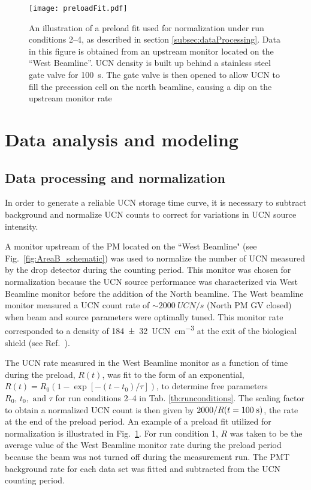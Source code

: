 \begin{figure}
    \centering
    \texttt{[image: preloadFit.pdf]}
    \caption[An illustration of a preload fit used for normalization under run conditions 2--4, as described in section \ref{subsec:dataProcessing}.]
    {An illustration of a preload fit used for normalization under run conditions 2--4, as described in section \ref{subsec:dataProcessing}. Data in this figure is obtained from an upstream monitor located on the ``West Beamline''. UCN density is built up behind a stainless steel gate valve for \qty{100}{\s}. The gate valve is then opened to allow UCN to fill the precession cell on the north beamline, causing a dip on the upstream monitor rate}
    \label{fig:preloadFit}
\end{figure}


\section{\label{sec:analysis}Data analysis and modeling}

\subsection{\label{subsec:dataProcessing}Data processing and normalization}


In order to generate a reliable UCN storage time curve, it is necessary to subtract background and normalize UCN counts to correct for variations in UCN source intensity.

A monitor upstream of the PM located on the ``West Beamline" (see Fig.~\ref{fig:AreaB_schematic}) was used to normalize the number of UCN measured by the drop detector during the counting period. This monitor was chosen for normalization because the UCN source performance was characterized via West Beamline monitor before the addition of the North beamline. The West beamline monitor measured a UCN count rate of $\sim\qty{2000}{UCN \per s}$ (North PM GV closed) when beam and source parameters were optimally tuned. This monitor rate corresponded to a density of \qty{184(32)}{UCN\per\cm^3} at the exit of the biological shield (see Ref.~\cite{ito_performance_2018}).

The UCN rate measured in the West Beamline monitor as a function of time during the preload, $R(t)$, was fit to the form of an exponential, $R(t) = R_0( 1-\exp[-(t-t_0) /\tau ] )$, to determine free parameters $R_0,\,t_0,\text{ and } \tau$ for run conditions 2--4 in Tab. \ref{tb:runconditions}. The scaling factor to obtain a normalized UCN count is then given by $2000 / R(t=100\;{\rm s})$, the rate at the end of the preload period. An example of a preload fit utilized for normalization is illustrated in Fig.~\ref{fig:preloadFit}. For run condition 1, $R$ was taken to be the average value of the West Beamline monitor rate during the preload period because the beam was not turned off during the measurement run. The PMT background rate for each data set was fitted and subtracted from the UCN counting period.

